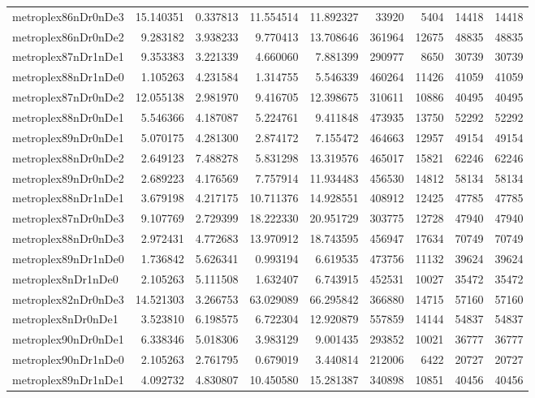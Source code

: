 \begin{longtable}{|l|r|r|r|r|r|r|r|r|}
metroplex86nDr0nDe3 & 15.140351 & 0.337813 & 11.554514 & 11.892327 & 33920 & 5404 & 14418 & 14418 \\
metroplex86nDr0nDe2 & 9.283182 & 3.938233 & 9.770413 & 13.708646 & 361964 & 12675 & 48835 & 48835 \\
metroplex87nDr1nDe1 & 9.353383 & 3.221339 & 4.660060 & 7.881399 & 290977 & 8650 & 30739 & 30739 \\
metroplex88nDr1nDe0 & 1.105263 & 4.231584 & 1.314755 & 5.546339 & 460264 & 11426 & 41059 & 41059 \\
metroplex87nDr0nDe2 & 12.055138 & 2.981970 & 9.416705 & 12.398675 & 310611 & 10886 & 40495 & 40495 \\
metroplex88nDr0nDe1 & 5.546366 & 4.187087 & 5.224761 & 9.411848 & 473935 & 13750 & 52292 & 52292 \\
metroplex89nDr0nDe1 & 5.070175 & 4.281300 & 2.874172 & 7.155472 & 464663 & 12957 & 49154 & 49154 \\
metroplex88nDr0nDe2 & 2.649123 & 7.488278 & 5.831298 & 13.319576 & 465017 & 15821 & 62246 & 62246 \\
metroplex89nDr0nDe2 & 2.689223 & 4.176569 & 7.757914 & 11.934483 & 456530 & 14812 & 58134 & 58134 \\
metroplex88nDr1nDe1 & 3.679198 & 4.217175 & 10.711376 & 14.928551 & 408912 & 12425 & 47785 & 47785 \\
metroplex87nDr0nDe3 & 9.107769 & 2.729399 & 18.222330 & 20.951729 & 303775 & 12728 & 47940 & 47940 \\
metroplex88nDr0nDe3 & 2.972431 & 4.772683 & 13.970912 & 18.743595 & 456947 & 17634 & 70749 & 70749 \\
metroplex89nDr1nDe0 & 1.736842 & 5.626341 & 0.993194 & 6.619535 & 473756 & 11132 & 39624 & 39624 \\
metroplex8nDr1nDe0 & 2.105263 & 5.111508 & 1.632407 & 6.743915 & 452531 & 10027 & 35472 & 35472 \\
metroplex82nDr0nDe3 & 14.521303 & 3.266753 & 63.029089 & 66.295842 & 366880 & 14715 & 57160 & 57160 \\
metroplex8nDr0nDe1 & 3.523810 & 6.198575 & 6.722304 & 12.920879 & 557859 & 14144 & 54837 & 54837 \\
metroplex90nDr0nDe1 & 6.338346 & 5.018306 & 3.983129 & 9.001435 & 293852 & 10021 & 36777 & 36777 \\
metroplex90nDr1nDe0 & 2.105263 & 2.761795 & 0.679019 & 3.440814 & 212006 & 6422 & 20727 & 20727 \\
metroplex89nDr1nDe1 & 4.092732 & 4.830807 & 10.450580 & 15.281387 & 340898 & 10851 & 40456 & 40456 \\

\end{longtable}
